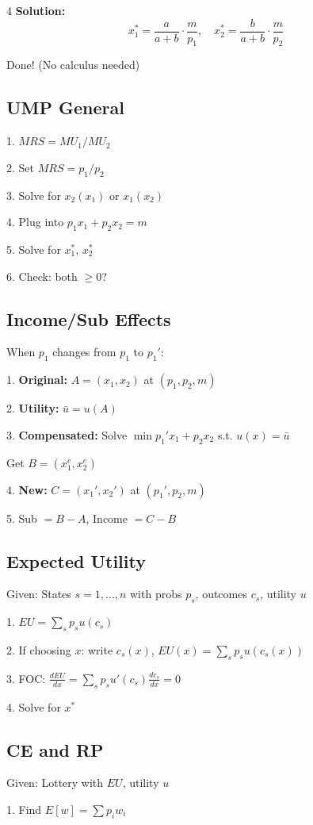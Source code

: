 \documentclass[8pt,landscape]{article}
\begin{document}
\begin{multicols}{4}
\textbf{Solution:}
$$x_1^* = \frac{a}{a+b} \cdot \frac{m}{p_1}, \quad x_2^* = \frac{b}{a+b} \cdot \frac{m}{p_2}$$

Done! (No calculus needed)

\subsection{UMP General}
1. $MRS = MU_1/MU_2$

2. Set $MRS = p_1/p_2$

3. Solve for $x_2(x_1)$ or $x_1(x_2)$

4. Plug into $p_1 x_1 + p_2 x_2 = m$

5. Solve for $x_1^*$, $x_2^*$

6. Check: both $\geq 0$?

\subsection{Income/Sub Effects}
When $p_1$ changes from $p_1$ to $p_1'$:

1. \textbf{Original:} $A = (x_1, x_2)$ at $(p_1, p_2, m)$

2. \textbf{Utility:} $\bar{u} = u(A)$

3. \textbf{Compensated:} Solve $\min p_1' x_1 + p_2 x_2$ s.t. $u(x) = \bar{u}$

   Get $B = (x_1^c, x_2^c)$

4. \textbf{New:} $C = (x_1', x_2')$ at $(p_1', p_2, m)$

5. Sub $= B - A$, Income $= C - B$

\subsection{Expected Utility}
Given: States $s=1,\ldots,n$ with probs $p_s$, outcomes $c_s$, utility $u$

1. $EU = \sum_s p_s u(c_s)$

2. If choosing $x$: write $c_s(x)$, $EU(x) = \sum_s p_s u(c_s(x))$

3. FOC: $\frac{dEU}{dx} = \sum_s p_s u'(c_s) \frac{dc_s}{dx} = 0$

4. Solve for $x^*$

\subsection{CE and RP}
Given: Lottery with $EU$, utility $u$

1. Find $E[w] = \sum p_i w_i$


\end{multicols}
\end{document}
